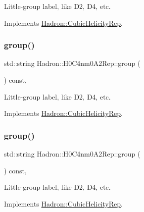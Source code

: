 Little-\/group label, like D2, D4, etc. 

Implements \mbox{\hyperlink{structHadron_1_1CubicHelicityRep_a101a7d76cd8ccdad0f272db44b766113}{Hadron\+::\+Cubic\+Helicity\+Rep}}.

\mbox{\label{structHadron_1_1H0C4nm0A2Rep_aef42f0970df5b016741ddfeccf659871}} 
\subsubsection{\texorpdfstring{group()}{group()}\hspace{0.1cm}{\footnotesize\ttfamily [3/5]}}
{\footnotesize\ttfamily std\+::string Hadron\+::\+H0\+C4nm0\+A2\+Rep\+::group (\begin{DoxyParamCaption}{ }\end{DoxyParamCaption}) const\hspace{0.3cm}{\ttfamily [inline]}, {\ttfamily [virtual]}}

Little-\/group label, like D2, D4, etc. 

Implements \mbox{\hyperlink{structHadron_1_1CubicHelicityRep_a101a7d76cd8ccdad0f272db44b766113}{Hadron\+::\+Cubic\+Helicity\+Rep}}.

\mbox{\label{structHadron_1_1H0C4nm0A2Rep_aef42f0970df5b016741ddfeccf659871}} 
\subsubsection{\texorpdfstring{group()}{group()}\hspace{0.1cm}{\footnotesize\ttfamily [4/5]}}
{\footnotesize\ttfamily std\+::string Hadron\+::\+H0\+C4nm0\+A2\+Rep\+::group (\begin{DoxyParamCaption}{ }\end{DoxyParamCaption}) const\hspace{0.3cm}{\ttfamily [inline]}, {\ttfamily [virtual]}}

Little-\/group label, like D2, D4, etc. 

Implements \mbox{\hyperlink{structHadron_1_1CubicHelicityRep_a101a7d76cd8ccdad0f272db44b766113}{Hadron\+::\+Cubic\+Helicity\+Rep}}.


